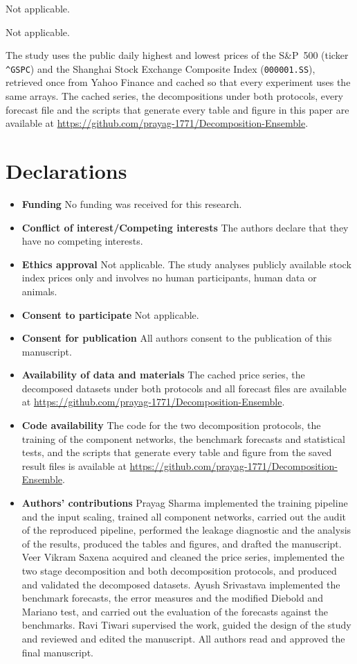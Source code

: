  Not applicable.

 Not applicable.

 The study uses the public daily highest and lowest prices of
the S\&P~500 (ticker \texttt{\textasciicircum GSPC}) and the Shanghai Stock Exchange
Composite Index (\texttt{000001.SS}), retrieved once from Yahoo Finance and cached so
that every experiment uses the same arrays. The cached series, the decompositions under
both protocols, every forecast file and the scripts that generate every table and figure
in this paper are available at
\url{https://github.com/prayag-1771/Decomposition-Ensemble}.

\section*{Declarations}

\begin{itemize}
\item \textbf{Funding} \; No funding was received for this research.
\item \textbf{Conflict of interest/Competing interests} \; The authors declare that
they have no competing interests.
\item \textbf{Ethics approval} \; Not applicable. The study analyses publicly available
stock index prices only and involves no human participants, human data or animals.
\item \textbf{Consent to participate} \; Not applicable.
\item \textbf{Consent for publication} \; All authors consent to the publication of this
manuscript.
\item \textbf{Availability of data and materials} \; The cached price series, the
decomposed datasets under both protocols and all forecast files are available at
\url{https://github.com/prayag-1771/Decomposition-Ensemble}.
\item \textbf{Code availability} \; The code for the two decomposition protocols, the
training of the component networks, the benchmark forecasts and statistical tests, and
the scripts that generate every table and figure from the saved result files is
available at \url{https://github.com/prayag-1771/Decomposition-Ensemble}.
\item \textbf{Authors' contributions} \; Prayag Sharma implemented the training
pipeline and the input scaling, trained all component networks, carried out the audit
of the reproduced pipeline, performed the leakage diagnostic and the analysis of the
results, produced the tables and figures, and drafted the manuscript. Veer Vikram
Saxena acquired and cleaned the price series, implemented the two stage decomposition
and both decomposition protocols, and produced and validated the decomposed datasets.
Ayush Srivastava implemented the benchmark forecasts, the error measures and the
modified Diebold and Mariano test, and carried out the evaluation of the forecasts
against the benchmarks. Ravi Tiwari supervised the work, guided the design of the study
and reviewed and edited the manuscript. All authors read and approved the final
manuscript.
\end{itemize}
